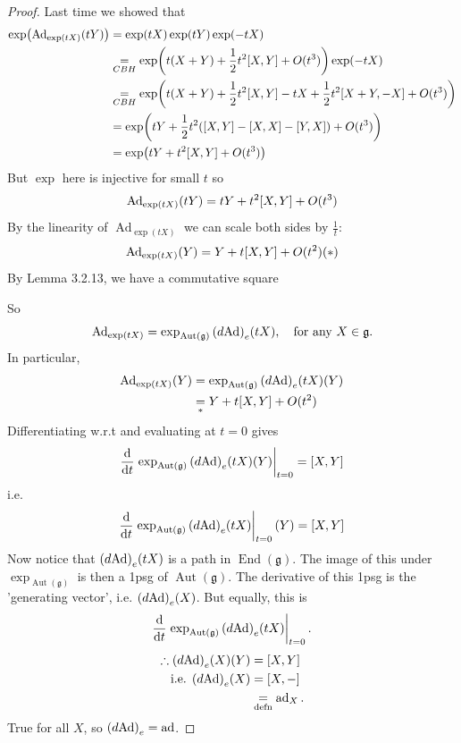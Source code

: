 \documentclass[12pt,a4paper]{article}
\newcommand{\dg}[1]{\ensuremath{d {#1}}}
\newcommand{\lalg}{\ensuremath{\mathfrak{g}}}
\newcommand{\Ad}{\ensuremath{\operatorname{Ad}}}
\newcommand{\Adh}[1]{\ensuremath{\operatorname{Ad}_{#1}}}
\newcommand{\ad}{\ensuremath{\operatorname{ad}}}
\newcommand{\adx}{\ensuremath{\operatorname{ad}_X}}
\begin{document}
\begin{proof}
Last time we showed that 
\begin{align*}
\exp(\Adh{\exp(tX)}(tY))&=\exp(tX)\exp(tY)\exp(-tX)\\
&\underset{CBH}{=} \exp(t(X+Y)+\frac{1}{2}t^2\comm{X}{Y}+O(t^3))\exp(-tX)\\
&\underset{CBH}{=} \exp(t(X+Y)+\frac{1}{2}t^2\comm{X}{Y} - tX +\frac{1}{2}t^2\comm{X+Y}{-X}+O(t^3))\\
&= \exp(tY+\frac{1}{2}t^2\qty(\comm{X}{Y} - \comm{X}{X}-\comm{Y}{X})+O(t^3))\\
&= \exp(tY+t^2\comm{X}{Y}+O(t^3))
\end{align*}
But $\exp$ here is injective for small $t$ so 
\[\Adh{\exp(tX)}(tY)=tY+t^2\comm{X}{Y}+O(t^3)\]
By the linearity of $\Adh{\exp(tX)}$ we can scale both sides by $\frac{1}{t}$:
\[\Adh{\exp(tX)}(Y)=Y+t\comm{X}{Y}+O(t^2) (*)\]
By Lemma 3.2.13, we have a commutative square
\begin{center}
\end{center}
So
\[\Adh{\exp(tX)}=\exp_{\operatorname{Aut}(\lalg)}\qty(\dg{\Ad})_e (tX), \quad \text{for any } X\in \lalg.\]
In particular, 
\begin{align*}
\Adh{\exp(tX)}(Y)&=\exp_{\operatorname{Aut}(\lalg)}\qty(\dg{\Ad})_e (tX)(Y)\\
&\underset{*}{=}Y+t\comm{X}{Y}+O(t^2)
\end{align*}
Differentiating w.r.t and evaluating at $t=0$ gives
\[\dv{t}\eval{\exp_{\operatorname{Aut}(\lalg)}\qty(\dg{\Ad})_e (tX)(Y)}_{t=0}=\comm{X}{Y}\]
i.e. 
\[\dv{t}\eval{\exp_{\operatorname{Aut}(\lalg)}\qty(\dg{\Ad})_e (tX)}_{t=0}(Y)=\comm{X}{Y}\]
Now notice that $\qty(\dg{\Ad})_e (tX)$ is a path in $\operatorname{End}(\lalg)$. The image of this under $\exp_{\operatorname{Aut}(\lalg)}$ is then a 1psg of $\operatorname{Aut}(\lalg)$. The derivative of this 1psg is the 'generating vector', i.e. $\qty(\dg{\Ad})_e(X)$. But equally, this is 
\[\dv{t}\eval{\exp_{\operatorname{Aut}(\lalg)}\qty(\dg{\Ad})_e (tX)}_{t=0}.\]
\begin{align*}
\therefore \qty(\dg{\Ad})_e (X)(Y)&=\comm{X}{Y}\\
\text{i.e. }  \qty(\dg{\Ad})_e (X)&=\comm{X}{-}\\
&\underset{\text{defn}}{=}\adx.
\end{align*}
True for all $X$, so $\qty(\dg{\Ad})_e=\ad$.
\end{proof}
\end{document}

